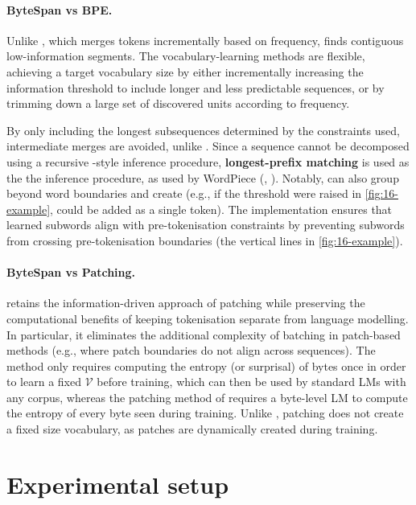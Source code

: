 \paragraph{ByteSpan vs BPE.}

Unlike \bpe, which merges tokens incrementally based on frequency, \tokname finds contiguous low-information segments. The vocabulary-learning methods are flexible, achieving a target vocabulary size by either incrementally increasing the information threshold to include longer and less predictable sequences, or by trimming down a large set of discovered units according to frequency.

By only including the longest subsequences determined by the constraints used, intermediate merges are avoided, unlike \bpe. Since a sequence cannot be decomposed using a recursive \bpe-style inference procedure, \textbf{longest-prefix matching} is used as the the inference procedure, as used by WordPiece (\wordpiece, \citealp{schuster-nakajima-2012-voice}). Notably, \tokname can also group beyond word boundaries and create  (e.g., if the threshold were raised in \cref{fig:16-example},  could be added as a single token). The implementation ensures that learned subwords align with \bpe pre-tokenisation constraints by preventing subwords from crossing pre-tokenisation boundaries (the vertical lines in \cref{fig:16-example}).

\paragraph{ByteSpan vs Patching.}
\tokname retains the information-driven approach of patching while preserving the computational benefits of keeping tokenisation separate from language modelling. In particular, it eliminates the additional complexity of batching in patch-based methods (e.g., where patch boundaries do not align across sequences). The method only requires computing the entropy (or surprisal) of bytes once in order to learn a fixed \(\mathcal{V}\) before training, which can then be used by standard LMs with any corpus, whereas the patching method of \citet{pagnoni2024byte} requires a byte-level LM to compute the entropy of every byte seen during training. Unlike \tokname, patching does not create a fixed size vocabulary, as patches are dynamically created during training.

\section{Experimental setup}\label{sec:16-setup}

